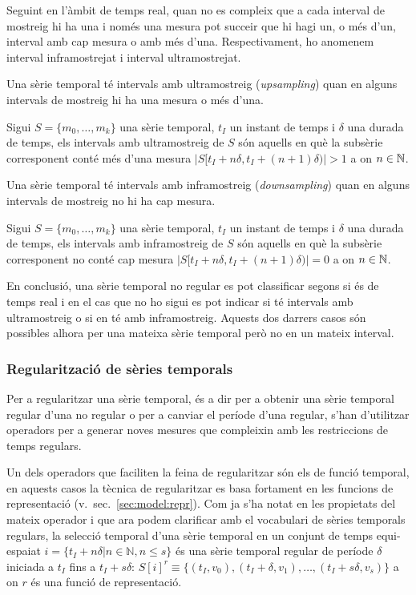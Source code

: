 Seguint en l'àmbit de temps real, quan no es compleix que a cada
interval de mostreig hi ha una i només una mesura pot succeir que hi
hagi un, o més d'un, interval amb cap mesura o amb més
d'una. Respectivament, ho anomenem interval inframostrejat i interval
ultramostrejat. 



Una sèrie temporal té intervals amb ultramostreig (\emph{upsampling})
quan en alguns intervals de mostreig hi ha una mesura o més d'una.
\begin{definition}
  Sigui $S=\{m_0,\dotsc,m_k\}$ una sèrie temporal, $t_I$ un instant de
  temps i $\delta$ una durada de temps, els intervals amb
  ultramostreig de $S$ són aquells en què la
  subsèrie corresponent conté més d'una mesura
  $|S[t_I+n\delta,t_I+(n+1)\delta)|>1$ a on $n\in\mathbb{N}$.
\end{definition}

Una sèrie temporal té intervals amb inframostreig
(\emph{downsampling}) quan en alguns intervals de mostreig no hi ha
cap mesura.
\begin{definition}
  Sigui $S=\{m_0,\dotsc,m_k\}$ una sèrie temporal, $t_I$ un instant de
  temps i $\delta$ una durada de temps, els intervals amb
  inframostreig de $S$ són aquells en què la
  subsèrie corresponent no conté cap mesura
  $|S[t_I+n\delta,t_I+(n+1)\delta)|=0$ a on $n\in\mathbb{N}$.
\end{definition}

En conclusió, una sèrie temporal no regular es pot classificar segons
si és de temps real i en el cas que no ho sigui es pot indicar si té
intervals amb ultramostreig o si en té amb inframostreig. Aquests dos
darrers casos són possibles alhora per una mateixa sèrie temporal però
no en un mateix interval.


\subsubsection{Regularització de sèries temporals}

Per a regularitzar una sèrie temporal, és a dir per a obtenir una
sèrie temporal regular d'una no regular o per a canviar el període
d'una regular, s'han d'utilitzar operadors per a generar noves mesures
que compleixin amb les restriccions de temps regulars.


Un dels operadors que faciliten la feina de regularitzar són els de
funció temporal, en aquests casos la tècnica de regularitzar es basa
fortament en les funcions de representació (v.\
sec.~\ref{sec:model:repr}).  Com ja s'ha notat en les propietats del
mateix operador i que ara podem clarificar amb el vocabulari de sèries
temporals regulars, la selecció temporal d'una sèrie temporal en un
conjunt de temps equi-espaiat $i = \{t_I+n\delta | n\in\mathbb{N},
n\leq s \}$ és una sèrie temporal regular de període $\delta$ iniciada
a $t_I$ fins a $t_I+s\delta$: $S[i]^r \equiv \{ (t_I, v_0),
(t_I+\delta,v_1), \dotsc , (t_I+s\delta,v_s)\}$ a on $r$ és una funció
de representació.


